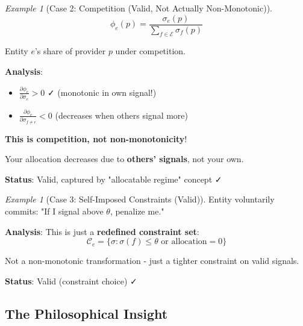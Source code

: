 \documentclass[11pt,a4paper]{article}
\theoremstyle{definition}
\theoremstyle{remark}
\newtheorem{example}[theorem]{Example}
\newcommand{\E}{\mathcal{E}}
\newcommand{\C}{\mathcal{C}}
\begin{document}
\begin{example}[Case 2: Competition (Valid, Not Actually Non-Monotonic)]
\[ \phi_e(p) = \frac{\sigma_e(p)}{\sum_{f \in \E} \sigma_f(p)} \]

Entity $e$'s share of provider $p$ under competition.

\textbf{Analysis}:
\begin{itemize}
\item $\frac{\partial \phi_e}{\partial \sigma_e} > 0$ ✓ (monotonic in own signal!)
\item $\frac{\partial \phi_e}{\partial \sigma_{f \ne e}} < 0$ (decreases when others signal more)
\end{itemize}

\textbf{This is competition, not non-monotonicity}!

Your allocation decreases due to \textbf{others' signals}, not your own.

\textbf{Status}: Valid, captured by "allocatable regime" concept ✓
\end{example}

\begin{example}[Case 3: Self-Imposed Constraints (Valid)]
Entity voluntarily commits: "If I signal above $\theta$, penalize me."

\textbf{Analysis}: This is just a \textbf{redefined constraint set}:
\[ \C_e = \{\sigma : \sigma(f) \le \theta \text{ or allocation} = 0\} \]

Not a non-monotonic transformation - just a tighter constraint on valid signals.

\textbf{Status}: Valid (constraint choice) ✓
\end{example}

\subsection{The Philosophical Insight}

\begin{center}
\end{center}
\end{document}

